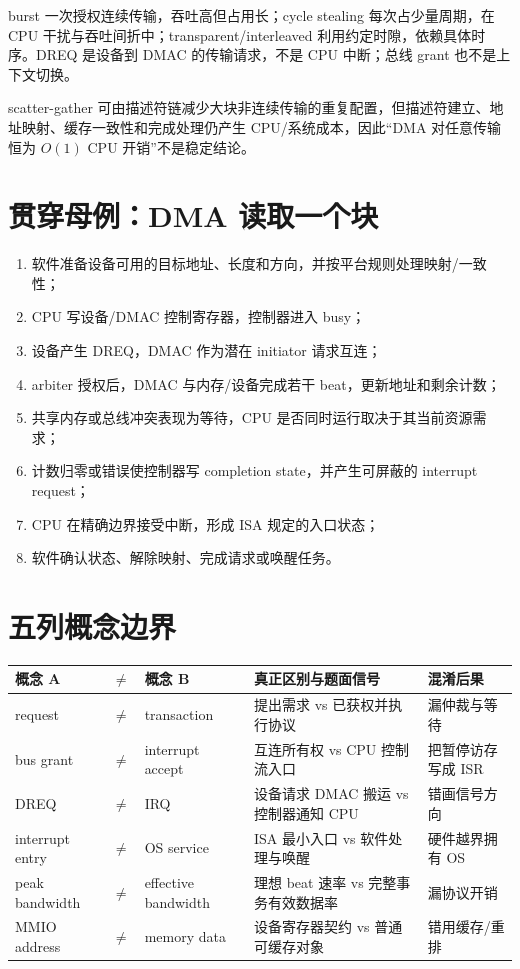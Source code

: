 \documentclass[UTF8,fontset=fandol,11pt,a4paper]{ctexart}
\begin{document}
burst 一次授权连续传输，吞吐高但占用长；cycle stealing 每次占少量周期，在 CPU 干扰与吞吐间折中；transparent/interleaved 利用约定时隙，依赖具体时序。DREQ 是设备到 DMAC 的传输请求，不是 CPU 中断；总线 grant 也不是上下文切换。

scatter-gather 可由描述符链减少大块非连续传输的重复配置，但描述符建立、地址映射、缓存一致性和完成处理仍产生 CPU/系统成本，因此“DMA 对任意传输恒为 $O(1)$ CPU 开销”不是稳定结论。

\section{贯穿母例：DMA 读取一个块}
\begin{enumerate}
\item 软件准备设备可用的目标地址、长度和方向，并按平台规则处理映射/一致性；
\item CPU 写设备/DMAC 控制寄存器，控制器进入 busy；
\item 设备产生 DREQ，DMAC 作为潜在 initiator 请求互连；
\item arbiter 授权后，DMAC 与内存/设备完成若干 beat，更新地址和剩余计数；
\item 共享内存或总线冲突表现为等待，CPU 是否同时运行取决于其当前资源需求；
\item 计数归零或错误使控制器写 completion state，并产生可屏蔽的 interrupt request；
\item CPU 在精确边界接受中断，形成 ISA 规定的入口状态；
\item 软件确认状态、解除映射、完成请求或唤醒任务。
\end{enumerate}

\section{五列概念边界}
\begin{center}\small
\begin{tabularx}{\linewidth}{L{1.8cm}C{0.35cm}L{1.9cm}YY}\toprule
概念 A & $\neq$ & 概念 B & 真正区别与题面信号 & 混淆后果\\\midrule
request & $\neq$ & transaction & 提出需求 vs 已获权并执行协议 & 漏仲裁与等待\\
bus grant & $\neq$ & interrupt accept & 互连所有权 vs CPU 控制流入口 & 把暂停访存写成 ISR\\
DREQ & $\neq$ & IRQ & 设备请求 DMAC 搬运 vs 控制器通知 CPU & 错画信号方向\\
interrupt entry & $\neq$ & OS service & ISA 最小入口 vs 软件处理与唤醒 & 硬件越界拥有 OS\\
peak bandwidth & $\neq$ & effective bandwidth & 理想 beat 速率 vs 完整事务有效数据率 & 漏协议开销\\
MMIO address & $\neq$ & memory data & 设备寄存器契约 vs 普通可缓存对象 & 错用缓存/重排\\
\bottomrule
\end{tabularx}
\end{center}
\end{document}
